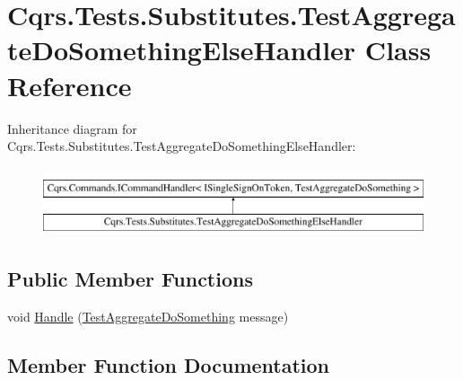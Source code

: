 \hypertarget{classCqrs_1_1Tests_1_1Substitutes_1_1TestAggregateDoSomethingElseHandler}{}\section{Cqrs.\+Tests.\+Substitutes.\+Test\+Aggregate\+Do\+Something\+Else\+Handler Class Reference}
\label{classCqrs_1_1Tests_1_1Substitutes_1_1TestAggregateDoSomethingElseHandler}
Inheritance diagram for Cqrs.\+Tests.\+Substitutes.\+Test\+Aggregate\+Do\+Something\+Else\+Handler\+:\begin{figure}[H]
\begin{center}
\leavevmode
\includegraphics[height=2.000000cm]{classCqrs_1_1Tests_1_1Substitutes_1_1TestAggregateDoSomethingElseHandler}
\end{center}
\end{figure}
\subsection*{Public Member Functions}
\begin{DoxyCompactItemize}
\item 
void \hyperlink{classCqrs_1_1Tests_1_1Substitutes_1_1TestAggregateDoSomethingElseHandler_a513bed5d82a997c4b5df4fb77a449ae9}{Handle} (\hyperlink{classCqrs_1_1Tests_1_1Substitutes_1_1TestAggregateDoSomething}{Test\+Aggregate\+Do\+Something} message)
\end{DoxyCompactItemize}


\subsection{Member Function Documentation}
\mbox{\label{classCqrs_1_1Tests_1_1Substitutes_1_1TestAggregateDoSomethingElseHandler_a513bed5d82a997c4b5df4fb77a449ae9}} 
